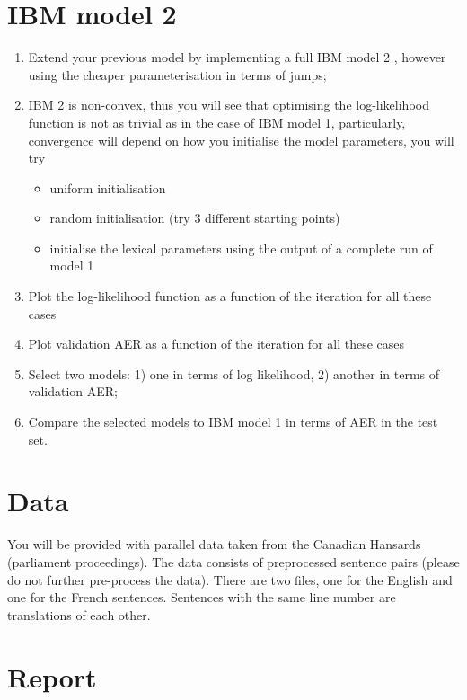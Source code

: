 
\section{IBM model 2}

\begin{enumerate}
  \item Extend your previous model by implementing a full IBM model 2 \citep{Brown+1993:smt}, however using the cheaper parameterisation in terms of jumps;
  \item IBM 2 is non-convex, thus you will see that optimising the log-likelihood function is 
        not as trivial as in the case of IBM model 1, particularly, convergence will depend 
        on how you initialise the model parameters, you will try
  \begin{itemize}
    \item uniform initialisation
    \item random initialisation (try 3 different starting points)
    \item initialise the lexical parameters using the output of a complete run of model 1
  \end{itemize}
  \item Plot the log-likelihood function as a function of the iteration for all these cases
  \item Plot validation AER as a function of the iteration for all these cases
  \item Select two models: 1) one in terms of log likelihood, 2) another in terms of validation AER;
  \item Compare the selected models to IBM model 1 in terms of AER in the test set.
\end{enumerate}

\section{Data}
You will be provided with parallel data taken from the Canadian Hansards (parliament proceedings). 
The data consists
of preprocessed sentence pairs (please do not further pre-process the data). There are two files, one for the
English and one for the French sentences. Sentences with the same line number are translations of each other.


\section{Report}

